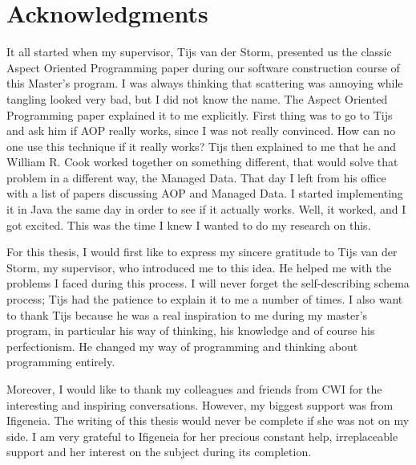 

\chapter*{Acknowledgments}
It all started when my supervisor, Tijs van der Storm, presented us the classic Aspect Oriented Programming paper during our software construction course of this Master's program.
I was always thinking that scattering was annoying while tangling looked very bad, but I did not know the name. 
The Aspect Oriented Programming paper explained it to me explicitly.
First thing was to go to Tijs and ask him if AOP really works, since I was not really convinced.
How can no one use this technique if it really works?
Tijs then explained to me that he and William R. Cook worked together on something different, that would solve that problem in a different way, the Managed Data.
That day I left from his office with a list of papers discussing AOP and Managed Data.
I started implementing it in Java the same day in order to see if it actually works.
Well, it worked, and I got excited.
This was the time I knew I wanted to do my research on this.

For this thesis, I would first like to express my sincere gratitude to Tijs van der Storm, my supervisor, who introduced me to this idea.
He helped me with the problems I faced during this process.
I will never forget the self-describing schema process; Tijs had the patience to explain it to me a number of times.
I also want to thank Tijs because he was a real inspiration to me during my master's program, in particular his way of thinking, his knowledge and of course his perfectionism. 
He changed my way of programming and thinking about programming entirely.

Moreover, I would like to thank my colleagues and friends from CWI for the interesting and inspiring conversations.
However, my biggest support was from Ifigeneia.
The writing of this thesis would never be complete if she was not on my side.
I am very grateful to Ifigeneia for her precious constant help, irreplaceable support and her interest on the subject during its completion.

